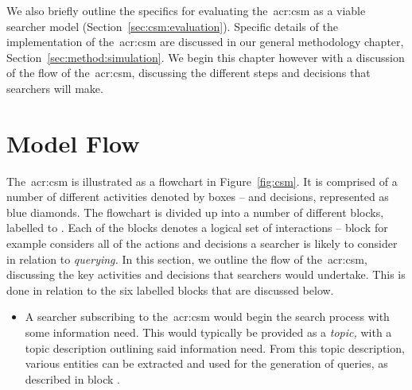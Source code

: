 We also briefly outline the specifics for evaluating the~\gls{acr:csm} as a viable searcher model (Section~\ref{sec:csm:evaluation}). Specific details of the implementation of the~\gls{acr:csm} are discussed in our general methodology chapter, Section~\ref{sec:method:simulation}. We begin this chapter however with a discussion of the flow of the~\gls{acr:csm}, discussing the different steps and decisions that searchers will make.

\section{Model Flow}\label{sec:csm:flow}
The~\gls{acr:csm} is illustrated as a flowchart in Figure~\ref{fig:csm}. It is comprised of a number of different activities denoted by boxes -- and decisions, represented as blue diamonds. The flowchart is divided up into a number of different blocks, labelled  to . Each of the blocks denotes a logical set of interactions -- block  for example considers all of the actions and decisions a searcher is likely to consider in relation to \emph{querying.} In this section, we outline the flow of the~\gls{acr:csm}, discussing the key activities and decisions that searchers would undertake. This is done in relation to the six labelled blocks that are discussed below.

\begin{itemize}
    
    \item[\blueboxbold{A}]{ A searcher subscribing to the~\gls{acr:csm} would begin the search process with some information need. This would typically be provided as a \emph{topic,} with a topic description outlining said information need. From this topic description, various entities can be extracted and used for the generation of queries, as described in block .}

\end{itemize}

